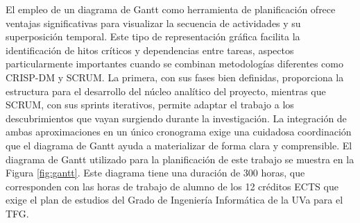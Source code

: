 El empleo de un diagrama de Gantt como herramienta de planificación ofrece ventajas significativas para visualizar la secuencia de actividades y su superposición temporal. Este tipo de representación gráfica facilita la identificación de hitos críticos y dependencias entre tareas, aspectos particularmente importantes cuando se combinan metodologías diferentes como CRISP-DM y SCRUM. La primera, con sus fases bien definidas, proporciona la estructura para el desarrollo del núcleo analítico del proyecto, mientras que SCRUM, con sus sprints iterativos, permite adaptar el trabajo a los descubrimientos que vayan surgiendo durante la investigación. La integración de ambas aproximaciones en un único cronograma exige una cuidadosa coordinación que el diagrama de Gantt ayuda a materializar de forma clara y comprensible. El diagrama de Gantt utilizado para la planificación de este trabajo se muestra en la Figura \ref{fig:gantt}. Este diagrama tiene una duración de 300 horas, que corresponden con las horas de trabajo de alumno de los 12 créditos ECTS que exige el plan de estudios del Grado de Ingeniería Informática de la UVa para el TFG.



